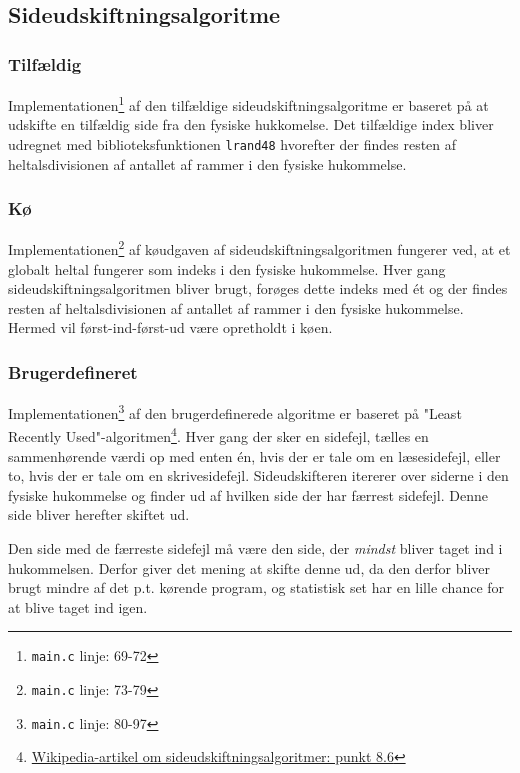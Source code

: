\subsection{Sideudskiftningsalgoritme}
\label{pagereplacementalgorithms}
\subsubsection{Tilfældig}
Implementationen\footnote{\texttt{main.c} linje: 69-72} af den tilfældige sideudskiftningsalgoritme er baseret på at udskifte en tilfældig side fra den fysiske hukkomelse. Det tilfældige index bliver udregnet med biblioteksfunktionen \texttt{lrand48} hvorefter der findes resten af heltalsdivisionen af antallet af rammer i den fysiske hukommelse.

\subsubsection{Kø}
Implementationen\footnote{\texttt{main.c} linje: 73-79} af køudgaven af sideudskiftningsalgoritmen fungerer ved, at et globalt heltal fungerer som indeks i den fysiske hukommelse. Hver gang sideudskiftningsalgoritmen bliver brugt, forøges dette indeks med ét og der findes resten af heltalsdivisionen af antallet af rammer i den fysiske hukommelse. Hermed vil først-ind-først-ud være opretholdt i køen.

\subsubsection{Brugerdefineret}
Implementationen\footnote{\texttt{main.c} linje: 80-97} af den brugerdefinerede algoritme er baseret på "Least Recently Used"-algoritmen\footnote{\href{https://en.wikipedia.org/wiki/Page_replacement_algorithm}{Wikipedia-artikel om sideudskiftningsalgoritmer: punkt 8.6}}. Hver gang der sker en sidefejl, tælles en sammenhørende værdi op med enten én, hvis der er tale om en læsesidefejl, eller to, hvis der er tale om en skrivesidefejl. Sideudskifteren itererer over siderne i den fysiske hukommelse og finder ud af hvilken side der har færrest sidefejl. Denne side bliver herefter skiftet ud. 

Den side med de færreste sidefejl må være den side, der \textit{mindst} bliver taget ind i hukommelsen. Derfor giver det mening at skifte denne ud, da den derfor bliver brugt mindre af det p.t. kørende program, og statistisk set har en lille chance for at blive taget ind igen.
